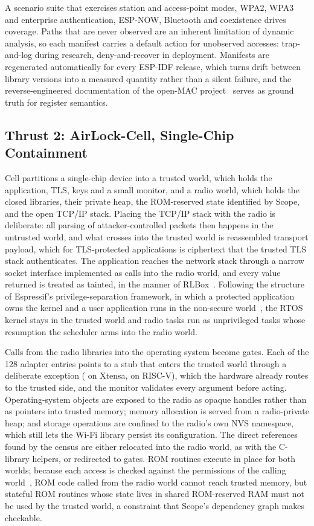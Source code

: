 \documentclass[conference,10pt]{IEEEtran}
\newcommand{\sym}[1]{\texttt{\detokenize{#1}}}
\begin{document}
A scenario suite that exercises station and access-point modes, WPA2, WPA3 and enterprise authentication, ESP-NOW, Bluetooth and coexistence drives coverage. Paths that are never observed are an inherent limitation of dynamic analysis, so each manifest carries a default action for unobserved accesses: trap-and-log during research, deny-and-recover in deployment. Manifests are regenerated automatically for every ESP-IDF release, which turns drift between library versions into a measured quantity rather than a silent failure, and the reverse-engineered documentation of the open-MAC project~\cite{openmacrepo,devreker2024liberating} serves as ground truth for register semantics.

\subsection{Thrust 2: AirLock-Cell, Single-Chip Containment}

Cell partitions a single-chip device into a trusted world, which holds the application, TLS, keys and a small monitor, and a radio world, which holds the closed libraries, their private heap, the ROM-reserved state identified by Scope, and the open TCP/IP stack. Placing the TCP/IP stack with the radio is deliberate: all parsing of attacker-controlled packets then happens in the untrusted world, and what crosses into the trusted world is reassembled transport payload, which for TLS-protected applications is ciphertext that the trusted TLS stack authenticates. The application reaches the network stack through a narrow socket interface implemented as calls into the radio world, and every value returned is treated as tainted, in the manner of RLBox~\cite{narayan2020rlbox}. Following the structure of Espressif's privilege-separation framework, in which a protected application owns the kernel and a user application runs in the non-secure world~\cite{parekhprivsep}, the RTOS kernel stays in the trusted world and radio tasks run as unprivileged tasks whose resumption the scheduler arms into the radio world.

Calls from the radio libraries into the operating system become gates. Each of the 128 adapter entries points to a stub that enters the trusted world through a deliberate exception (\sym{SYSCALL} on Xtensa, \sym{ECALL} on RISC-V), which the hardware already routes to the trusted side, and the monitor validates every argument before acting. Operating-system objects are exposed to the radio as opaque handles rather than as pointers into trusted memory; memory allocation is served from a radio-private heap; and storage operations are confined to the radio's own NVS namespace, which still lets the Wi-Fi library persist its configuration. The direct references found by the census are either relocated into the radio world, as with the C-library helpers, or redirected to gates. ROM routines execute in place for both worlds; because each access is checked against the permissions of the calling world~\cite{espprivsepwcl}, ROM code called from the radio world cannot reach trusted memory, but stateful ROM routines whose state lives in shared ROM-reserved RAM must not be used by the trusted world, a constraint that Scope's dependency graph makes checkable.
\end{document}
